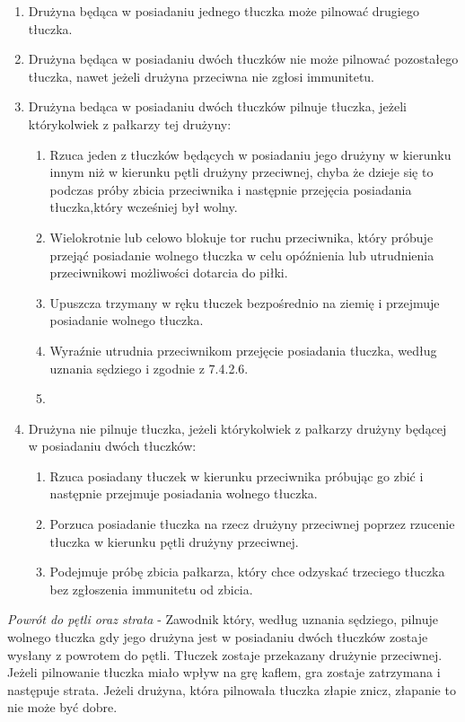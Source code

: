 \documentclass[12pt]{article}
\begin{document}
\begin{enumerate}
\item
    Drużyna będąca w posiadaniu jednego tłuczka może pilnować drugiego
  tłuczka.
  \item
    Drużyna będąca w posiadaniu dwóch tłuczków nie może pilnować
  pozostałego tłuczka, nawet jeżeli drużyna przeciwna nie zgłosi
  immunitetu.
  \item
    Drużyna bedąca w posiadaniu dwóch tłuczków pilnuje tłuczka, jeżeli
  którykolwiek z pałkarzy tej drużyny:
  
  \begin{enumerate}
  \item
        Rzuca jeden z tłuczków będących w posiadaniu jego drużyny w kierunku
    innym niż w kierunku pętli drużyny przeciwnej, chyba że dzieje się
    to podczas próby zbicia przeciwnika i następnie przejęcia posiadania
    tłuczka,który wcześniej był wolny.
      \item
        Wielokrotnie lub celowo blokuje tor ruchu przeciwnika, który próbuje
    przejąć posiadanie wolnego tłuczka w celu opóźnienia lub utrudnienia
    przeciwnikowi możliwości dotarcia do piłki.
      \item
        Upuszcza trzymany w ręku tłuczek bezpośrednio na ziemię i przejmuje
    posiadanie wolnego tłuczka.
      \item
        Wyraźnie utrudnia przeciwnikom przejęcie posiadania tłuczka, według
    uznania sędziego i zgodnie z 7.4.2.6.\item
      \end{enumerate}
\item
    Drużyna nie pilnuje tłuczka, jeżeli którykolwiek z pałkarzy drużyny
  będącej w posiadaniu dwóch tłuczków:
  
  \begin{enumerate}
  \item
        Rzuca posiadany tłuczek w kierunku przeciwnika próbując go zbić i
    następnie przejmuje posiadania wolnego tłuczka.
      \item
        Porzuca posiadanie tłuczka na rzecz drużyny przeciwnej poprzez
    rzucenie tłuczka w kierunku pętli drużyny przeciwnej.
      \item
        Podejmuje próbę zbicia pałkarza, który chce odzyskać trzeciego
    tłuczka bez zgłoszenia immunitetu od zbicia.
      \end{enumerate}
\end{enumerate}

\emph{Powrót do pętli oraz strata} - Zawodnik który, według uznania
sędziego, pilnuje wolnego tłuczka gdy jego drużyna jest w posiadaniu
dwóch tłuczków zostaje wysłany z powrotem do pętli. Tłuczek zostaje
przekazany drużynie przeciwnej. Jeżeli pilnowanie tłuczka miało wpływ na
grę kaflem, gra zostaje zatrzymana i następuje strata. Jeżeli drużyna,
która pilnowała tłuczka złapie znicz, złapanie to nie może być dobre.
\end{document}
